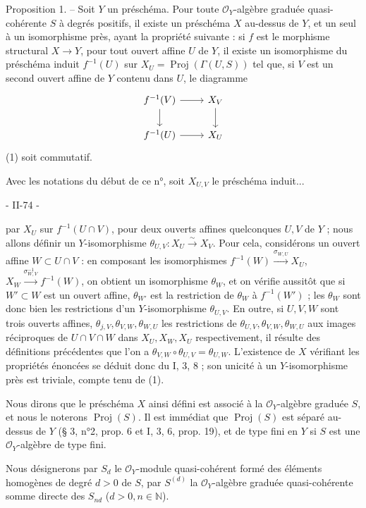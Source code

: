 Proposition 1. -- Soit $Y$ un préschéma. Pour toute $\mathcal{O}_Y$-algèbre graduée quasi-cohérente $S$ à degrés positifs, il existe un préschéma $X$ au-dessus de $Y$, et un seul à un isomorphisme près, ayant la propriété suivante : si $f$ est le morphisme structural $X \to Y$, pour tout ouvert affine $U$ de $Y$, il existe un isomorphisme du préschéma induit $f^{-1}(U)$ sur $X_U = \operatorname{Proj}(\Gamma(U, S))$ tel que, si $V$ est un second ouvert affine de $Y$ contenu dans $U$, le diagramme
$$
\begin{tikzcd}
f^{-1}(V) \ar[d] \ar[r] & X_V \ar[d] \\
f^{-1}(U) \ar[r] & X_U
\end{tikzcd}
$$
(1) soit commutatif.

Avec les notations du début de ce n°, soit $X_{U, V}$ le préschéma induit...

\newpage


- II-74 -

par $X_U$ sur $f^{-1}(U \cap V)$, pour deux ouverts affines quelconques $U, V$ de $Y$ ; nous allons définir un $Y$-isomorphisme $\theta_{U,V} : X_U \xrightarrow{\sim} X_V$. Pour cela, considérons un ouvert affine $W \subset U \cap V$ : en composant les isomorphismes $f^{-1}(W) \xrightarrow{\sigma_{W,U}} X_U$, $X_W \xrightarrow{\sigma_{W,V}^{-1}} f^{-1}(W)$, on obtient un isomorphisme $\theta_W$, et on vérifie aussitôt que si $W' \subset W$ est un ouvert affine, $\theta_{W'}$ est la restriction de $\theta_W$ à $f^{-1}(W')$ ; les $\theta_W$ sont donc bien les restrictions d'un $Y$-isomorphisme $\theta_{U,V}$. En outre, si $U, V, W$ sont trois ouverts affines, $\theta_{j,V}, \theta_{V,W}, \theta_{W,U}$ les restrictions de $\theta_{U,V}, \theta_{V,W}, \theta_{W,U}$ aux images réciproques de $U \cap V \cap W$ dans $X_U, X_W, X_U$ respectivement, il résulte des définitions précédentes que l'on a $\theta_{V,W} \circ \theta_{U,V} = \theta_{U,W}$. L'existence de $X$ vérifiant les propriétés énoncées se déduit donc du I, 3, 8 ; son unicité à un $Y$-isomorphisme près est triviale, compte tenu de (1).

Nous dirons que le préschéma $X$ ainsi défini est associé à la $\mathcal{O}_Y$-algèbre graduée $S$, et nous le noterons $\operatorname{Proj}(S)$. Il est immédiat que $\operatorname{Proj}(S)$ est séparé au-dessus de $Y$ (§ 3, n°2, prop. 6 et I, 3, 6, prop. 19), et de type fini en $Y$ si $S$ est une $\mathcal{O}_Y$-algèbre de type fini.

Nous désignerons par $S_d$ le $\mathcal{O}_Y$-module quasi-cohérent formé des éléments homogènes de degré $d > 0$ de $S$, par $S^{(d)}$ la $\mathcal{O}_Y$-algèbre graduée quasi-cohérente somme directe des $S_{nd}$ ($d > 0, n \in \mathbb{N}$).

